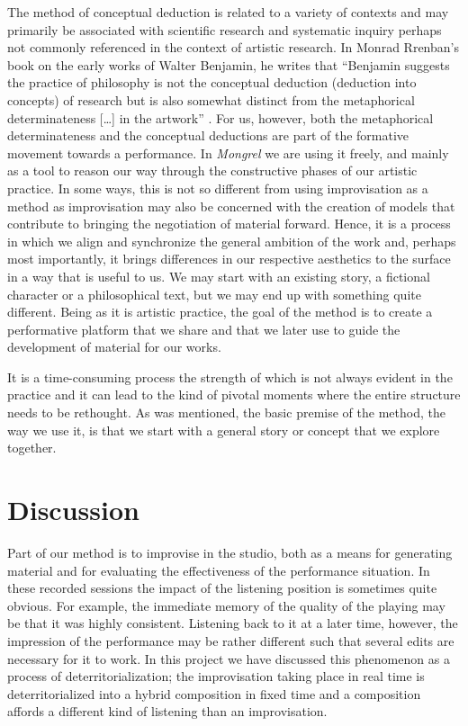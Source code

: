 \documentclass[11pt]{article}
\begin{document}
The method of conceptual deduction is related to a variety of contexts
and may primarily be associated with scientific research and
systematic inquiry perhaps not commonly referenced in the context of
artistic research. In Monrad Rrenban's book on the early works of
Walter Benjamin, he writes that ``Benjamin suggests the practice of
philosophy is not the conceptual deduction (deduction into concepts)
of research but is also somewhat distinct from the metaphorical
determinateness [\ldots] in the artwork''
\citep[p. 117]{rrenban2005}. For us, however, both the metaphorical
determinateness and the conceptual deductions are part of the
formative movement towards a performance. In \emph{Mongrel} we are
using it freely, and mainly as a tool to reason our way through the
constructive phases of our artistic practice. In some ways, this is
not so different from using improvisation as a method as improvisation
may also be concerned with the creation of models that contribute to
bringing the negotiation of material forward. Hence, it is a process
in which we align and synchronize the general ambition of the work
and, perhaps most importantly, it brings differences in our respective
aesthetics to the surface in a way that is useful to us. We may start
with an existing story, a fictional character or a philosophical text,
but we may end up with something quite different. Being as it is
artistic practice, the goal of the method is to create a
performative platform that we share and that we later use to guide the
development of material for our works.

It is a time-consuming process the strength of which is not always
evident in the practice and it can lead to the kind of pivotal moments
where the entire structure needs to be rethought. As was mentioned,
the basic premise of the method, the way we use it, is that we start
with a general story or concept that we explore together.

\section*{Discussion}
\label{sec:discussion}

Part of our method is to improvise in the studio, both as a means for
generating material and for evaluating the effectiveness of the
performance situation. In these recorded sessions the impact of the
listening position is sometimes quite obvious. For example, the
immediate memory of the quality of the playing may be that it was
highly consistent. Listening back to it at a later time, however, the
impression of the performance may be rather different such that
several edits are necessary for it to work. In this project we have
discussed this phenomenon as a process of deterritorialization; the
improvisation taking place in real time is deterritorialized into a
hybrid composition in fixed time and a composition affords a different
kind of listening than an improvisation. 
\end{document}
